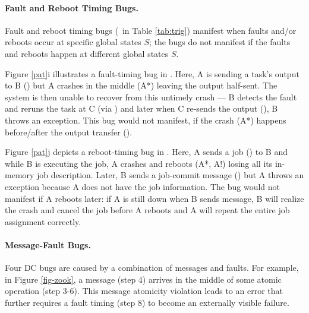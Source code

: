 


\paragraph{Fault and Reboot Timing Bugs.}

Fault and reboot timing bugs (\pctTrigFR\ in Table \ref{tab:trig})
manifest when faults and/or
reboots occur at specific global states $S$; the bugs do not
manifest if the faults and reboots happen at different global states
$S$. 

Figure \ref{pat}i illustrates a fault-timing bug in .  Here,
A is sending a task's output to B (\mab) but A
crashes in the middle (A*) leaving the output half-sent. 
The system is then unable to recover from this untimely crash --- B
detects the fault and reruns the task at C (via \mbc) and
later when C re-sends the output (\mcb), B throws an exception.  This
bug would not manifest, if the crash (A*) happens before/after
the output transfer (\mab).

Figure \ref{pat}j depicts a reboot-timing bug in .  Here,
A sends a job (\mab) to B and while B is executing the
job, A crashes and reboots (A*, A!)  losing all its in-memory job
description.  Later, B sends a job-commit message (\mba) but A throws
an exception because A does not have the job information.  The bug
would not manifest if A reboots later: if A is still down when B sends
\mba{} message, B will realize the crash and cancel the job before
A reboots and A will repeat the entire job assignment correctly.








\paragraph{Message-Fault Bugs.}
Four DC bugs are caused by a combination of messages and faults. 
For example, in Figure
\ref{fig-zook}, a message (step 4) arrives in the middle of some
atomic operation (step 3-6). This message atomicity violation leads
to an error that further requires a fault timing (step 8) to become an
externally visible failure.




